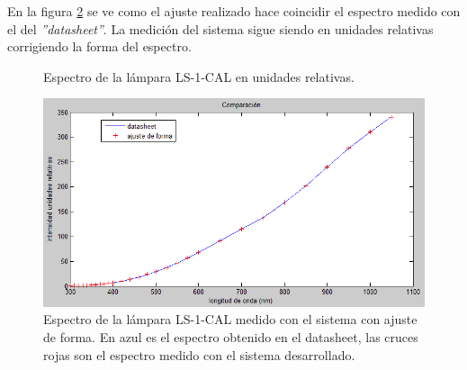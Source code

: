 En la figura \ref{fig:ajusteenforma} se ve como el ajuste realizado hace coincidir el espectro medido con el del \textit{''datasheet''}. La medición del sistema sigue siendo en unidades relativas corrigiendo la forma del espectro. 

\begin{figure}[t]
	\centering
	\caption{Espectro de la lámpara LS-1-CAL en unidades relativas.}
	\label{fig:ls-potencia}
\end{figure}

\begin{figure}[h]
	\centering
	\includegraphics[width=0.8\linewidth]{Imagenes/4/ajusteEnForma}
	\caption[Espectro de la lámpara LS-1-CAL medido con el sistema con ajuste de forma]{Espectro de la lámpara LS-1-CAL medido con el sistema con ajuste de forma. En azul es el espectro obtenido en el datasheet, las cruces rojas son el espectro medido con el sistema desarrollado.}
	\label{fig:ajusteenforma}
\end{figure}


